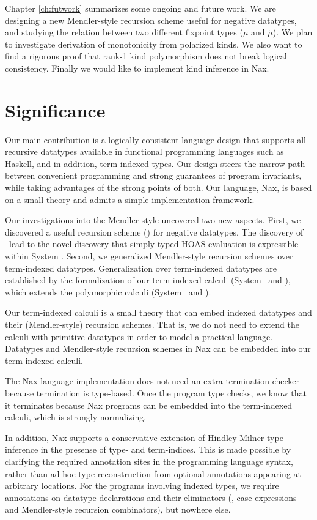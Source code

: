 Chapter \ref{ch:futwork} summarizes some ongoing and future work.
We are designing a new Mendler-style recursion scheme useful
for negative datatypes, and studying the relation between two different
fixpoint types ($\mu$ and $\breve\mu$). We plan to investigate derivation of
monotonicity from polarized kinds. We also want to find a rigorous proof 
that rank-1 kind polymorphism does not break logical consistency.
Finally we would like to implement kind inference in Nax.

\section{Significance}\label{sec:concl:sig}
Our main contribution is a logically consistent language design that supports
all recursive datatypes available in functional programming languages such as
Haskell, and in addition, term-indexed types. Our design steers the narrow
path between convenient programming and strong guarantees of program invariants,
while taking advantages of the strong points of both. Our language,
Nax, is based on a small theory and admits a simple implementation framework.

Our investigations into the Mendler style uncovered two new aspects.
First, we discovered a useful recursion scheme (\MsfIt) for negative datatypes.
The discovery of \MsfIt\ lead to the novel discovery that simply-typed HOAS
evaluation is expressible within System \Fw. Second, we generalized
Mendler-style recursion schemes over term-indexed datatypes.
Generalization over term-indexed datatypes are established by
the formalization of our term-indexed calculi (System \Fi\ and \Fixi),
which extends the polymorphic calculi (System \Fw\ and \Fixw).

Our term-indexed calculi is a small theory that can embed indexed datatypes
and their (Mendler-style) recursion schemes. That is, we do not need to extend
the calculi with primitive datatypes in order to model a practical language.
Datatypes and Mendler-style recursion schemes in Nax can be embedded into
our term-indexed calculi.

The Nax language implementation does not need an extra termination checker
because termination is type-based. Once the program type checks, we know
that it terminates because Nax programs can be embedded into
the term-indexed calculi, which is strongly normalizing.

In addition, Nax supports a conservative extension of Hindley-Milner
type inference in the presense of type- and term-indices.
This is made possible by clarifying the required annotation sites
in the programming language syntax, rather than ad-hoc type reconstruction
from optional annotations appearing at arbitrary locations.
For the programs involving indexed types, we require annotations
on datatype declarations and their eliminators
(\ie, case expressions and Mendler-style recursion combinators),
but nowhere else.

